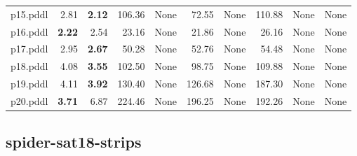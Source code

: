 \documentclass{article}
\begin{document}
\begin{tabular}{@{}lrrrrrrrrr@{}}
p15.pddl & 2.81 & \textbf{2.12} & 106.36 & \multicolumn{1}{|l|}{None} & 72.55 & \multicolumn{1}{|l|}{None} & 110.88 & \multicolumn{1}{|l|}{None} & \multicolumn{1}{|l|}{None} \\
p16.pddl & \textbf{2.22} & 2.54 & 23.16 & \multicolumn{1}{|l|}{None} & 21.86 & \multicolumn{1}{|l|}{None} & 26.16 & \multicolumn{1}{|l|}{None} & \multicolumn{1}{|l|}{None} \\
p17.pddl & 2.95 & \textbf{2.67} & 50.28 & \multicolumn{1}{|l|}{None} & 52.76 & \multicolumn{1}{|l|}{None} & 54.48 & \multicolumn{1}{|l|}{None} & \multicolumn{1}{|l|}{None} \\
p18.pddl & 4.08 & \textbf{3.55} & 102.50 & \multicolumn{1}{|l|}{None} & 98.75 & \multicolumn{1}{|l|}{None} & 109.88 & \multicolumn{1}{|l|}{None} & \multicolumn{1}{|l|}{None} \\
p19.pddl & 4.11 & \textbf{3.92} & 130.40 & \multicolumn{1}{|l|}{None} & 126.68 & \multicolumn{1}{|l|}{None} & 187.30 & \multicolumn{1}{|l|}{None} & \multicolumn{1}{|l|}{None} \\
p20.pddl & \textbf{3.71} & 6.87 & 224.46 & \multicolumn{1}{|l|}{None} & 196.25 & \multicolumn{1}{|l|}{None} & 192.26 & \multicolumn{1}{|l|}{None} & \multicolumn{1}{|l|}{None} \\
\end{tabular}

\hypertarget{search_start_time-spider-sat18-strips}{}
\subsection*{spider-sat18-strips}
\end{document}
